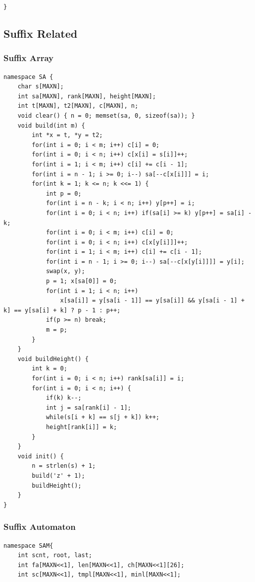 \documentclass[10pt]{ctexart}
\begin{document}
{\begin{lstlisting}
}
\end{lstlisting}
\subsection{Suffix Related}
\subsubsection{Suffix Array}
\begin{lstlisting}
namespace SA {
    char s[MAXN];
    int sa[MAXN], rank[MAXN], height[MAXN];
    int t[MAXN], t2[MAXN], c[MAXN], n;
    void clear() { n = 0; memset(sa, 0, sizeof(sa)); }
    void build(int m) {
        int *x = t, *y = t2;
        for(int i = 0; i < m; i++) c[i] = 0;
        for(int i = 0; i < n; i++) c[x[i] = s[i]]++;
        for(int i = 1; i < m; i++) c[i] += c[i - 1];
        for(int i = n - 1; i >= 0; i--) sa[--c[x[i]]] = i;
        for(int k = 1; k <= n; k <<= 1) {
            int p = 0;
            for(int i = n - k; i < n; i++) y[p++] = i;
            for(int i = 0; i < n; i++) if(sa[i] >= k) y[p++] = sa[i] - k;
            for(int i = 0; i < m; i++) c[i] = 0;
            for(int i = 0; i < n; i++) c[x[y[i]]]++;
            for(int i = 1; i < m; i++) c[i] += c[i - 1];
            for(int i = n - 1; i >= 0; i--) sa[--c[x[y[i]]]] = y[i];
            swap(x, y);
            p = 1; x[sa[0]] = 0;
            for(int i = 1; i < n; i++)
                x[sa[i]] = y[sa[i - 1]] == y[sa[i]] && y[sa[i - 1] + k] == y[sa[i] + k] ? p - 1 : p++;
            if(p >= n) break;
            m = p;
        }
    }
    void buildHeight() {
        int k = 0;
        for(int i = 0; i < n; i++) rank[sa[i]] = i;
        for(int i = 0; i < n; i++) {
            if(k) k--;
            int j = sa[rank[i] - 1];
            while(s[i + k] == s[j + k]) k++;
            height[rank[i]] = k;
        }
    }
    void init() {
        n = strlen(s) + 1;
        build('z' + 1);
        buildHeight();
    }
}
\end{lstlisting}
\subsubsection{Suffix Automaton}
\begin{lstlisting}
namespace SAM{
	int scnt, root, last;
	int fa[MAXN<<1], len[MAXN<<1], ch[MAXN<<1][26];
	int sc[MAXN<<1], tmpl[MAXN<<1], minl[MAXN<<1];
		

\end{lstlisting}}
\end{document}
